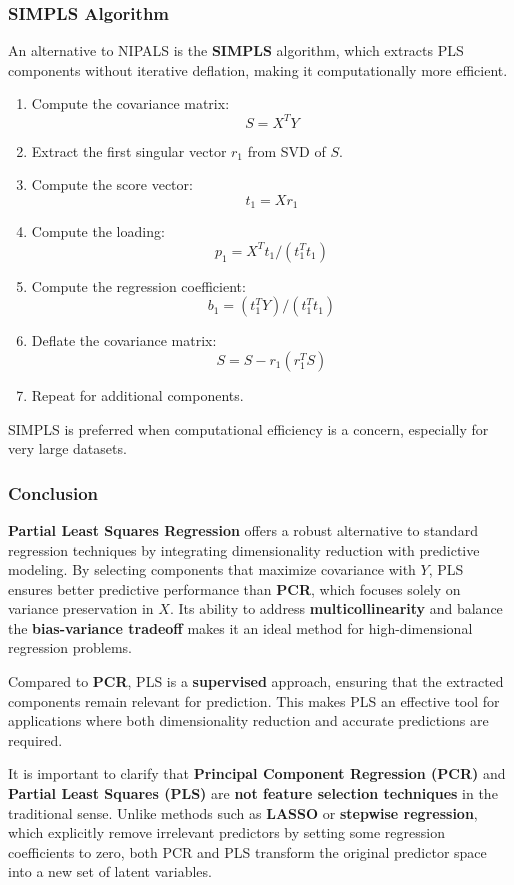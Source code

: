 \documentclass[11pt,twoside,a4paper]{article}
\begin{document}
\subsubsection{SIMPLS Algorithm}
An alternative to NIPALS is the \textbf{SIMPLS} algorithm, which extracts PLS components without iterative deflation, making it computationally more efficient.

\begin{enumerate}
    \item Compute the covariance matrix:
        \[
        S = X^T Y
        \]
    \item Extract the first singular vector \( r_1 \) from SVD of \( S \).
    \item Compute the score vector:
        \[
        t_1 = Xr_1
        \]
    \item Compute the loading:
        \[
        p_1 = X^T t_1 / (t_1^T t_1)
        \]
    \item Compute the regression coefficient:
        \[
        b_1 = (t_1^T Y) / (t_1^T t_1)
        \]
    \item Deflate the covariance matrix:
        \[
        S = S - r_1 (r_1^T S)
        \]
    \item Repeat for additional components.
\end{enumerate}

SIMPLS is preferred when computational efficiency is a concern, especially for very large datasets.


\subsubsection{Conclusion}
\textbf{Partial Least Squares Regression} offers a robust alternative to standard regression techniques by integrating dimensionality reduction with predictive modeling. By selecting components that maximize covariance with \( Y \), PLS ensures better predictive performance than \textbf{PCR}, which focuses solely on variance preservation in \( X \). Its ability to address \textbf{multicollinearity} and balance the \textbf{bias-variance tradeoff} makes it an ideal method for high-dimensional regression problems. 

Compared to \textbf{PCR}, PLS is a \textbf{supervised} approach, ensuring that the extracted components remain relevant for prediction. This makes PLS an effective tool for applications where both dimensionality reduction and accurate predictions are required.

It is important to clarify that \textbf{Principal Component Regression (PCR)} and \textbf{Partial Least Squares (PLS)} are \textbf{not feature selection techniques} in the traditional sense. Unlike methods such as \textbf{LASSO} or \textbf{stepwise regression}, which explicitly remove irrelevant predictors by setting some regression coefficients to zero, both PCR and PLS transform the original predictor space into a new set of latent variables.
\end{document}
